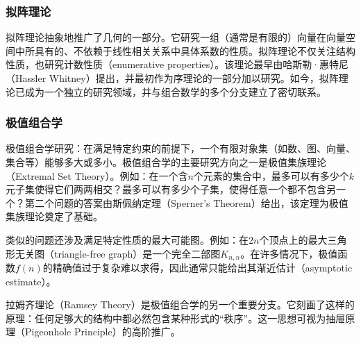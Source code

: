 \subsubsection{拟阵理论}
拟阵理论抽象地推广了几何的一部分。它研究一组（通常是有限的）向量在向量空间中所具有的、不依赖于线性相关关系中具体系数的性质。拟阵理论不仅关注结构性质，也研究计数性质（enumerative properties）。该理论最早由哈斯勒·惠特尼（Hassler Whitney）提出，并最初作为序理论的一部分加以研究。如今，拟阵理论已成为一个独立的研究领域，并与组合数学的多个分支建立了密切联系。
\subsubsection{极值组合学}
极值组合学研究：在满足特定约束的前提下，一个有限对象集（如数、图、向量、集合等）能够多大或多小。极值组合学的主要研究方向之一是极值集族理论（Extremal Set Theory）。例如：在一个含$n$个元素的集合中，最多可以有多少个$k$元子集使得它们两两相交？最多可以有多少个子集，使得任意一个都不包含另一个？第二个问题的答案由斯佩纳定理（Sperner’s Theorem）给出，该定理为极值集族理论奠定了基础。

类似的问题还涉及满足特定性质的最大可能图。例如：在$2n$个顶点上的最大三角形无关图（triangle-free graph）是一个完全二部图$K_{n,n}$。在许多情况下，极值函数$f(n)$的精确值过于复杂难以求得，因此通常只能给出其渐近估计（asymptotic estimate）。

拉姆齐理论（Ramsey Theory）是极值组合学的另一个重要分支。它刻画了这样的原理：任何足够大的结构中都必然包含某种形式的“秩序”。这一思想可视为抽屉原理（Pigeonhole Principle）的高阶推广。



